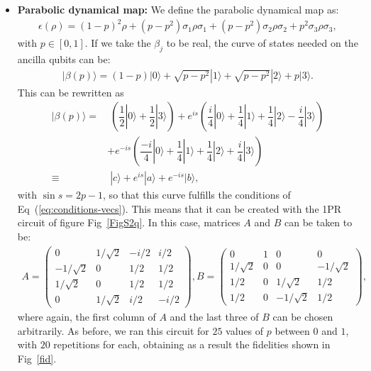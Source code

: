 \documentclass[10pt,letterpaper]{article} %
\newcommand{\fref}[1]{Fig~\ref{#1}}
\newcommand{\eref}[1]{Eq~(\ref{#1})}
\begin{document}
\begin{itemize}
\item \textbf{Parabolic dynamical map:} We define the parabolic dynamical map as:
\begin{eqnarray}
\epsilon(\rho) =  {(1-p)}^2  \rho + (p-p^2) \sigma_1 \rho \sigma_1 + (p-p^2) \sigma_2 \rho \sigma_2 + p^2 \sigma_3 \rho \sigma_3,
\label{eq:parab}
\end{eqnarray}
with $p \in [0,1]$. 
If we take the $\beta_j$ to be real,
the curve of states needed on the ancilla qubits can be:
\begin{eqnarray}
|\beta(p)\rangle =  (1-p) |0\rangle + \sqrt{p-p^2} |1\rangle +  \sqrt{p-p^2} |2\rangle + p |3\rangle.
\end{eqnarray}
This can be rewritten as
\begin{align*}
|\beta(p)\rangle =&\; \left( \dfrac{1}{2}|0\rangle + \dfrac{1}{2} |3\rangle \right) + e^{is} \left( \dfrac{i}{4}|0\rangle + \dfrac{1}{4} |1\rangle + \dfrac{1}{4} |2\rangle - \dfrac{i}{4} |3\rangle \right) \\
& + e^{-is}  \left( \dfrac{-i}{4} |0\rangle + \dfrac{1}{4} |1\rangle + \dfrac{1}{4} |2\rangle + \dfrac{i}{4} |3\rangle \right) \\
\equiv & \; |c\rangle + e^{is} |a\rangle + e^{-is} |b\rangle,
\end{align*}
with $\sin s = 2p-1$, so that
this curve fulfills the conditions of  \eref{eq:conditions-vecs}.
This  means that it can be created with the
1PR circuit of figure \fref{FigS2q}. In this
case, matrices $A$ and $B$ can be taken to be:
\begin{align*}
A = \begin{pmatrix}
0 & 1/\sqrt{2} & -i/2 & i/2 \\
-1/\sqrt{2} & 0 & 1/2 & 1/2 \\
1/\sqrt{2} & 0 & 1/2 & 1/2 \\
0 & 1/\sqrt{2} & i/2 & -i/2
\end{pmatrix},
B = \begin{pmatrix}
0 & 1 &0 &0 \\
1/\sqrt{2} & 0 & 0 &-1/\sqrt{2} \\
1/2 & 0 & 1/\sqrt{2} & 1/2 \\
1/2 & 0 & - 1/\sqrt{2} & 1/2
\end{pmatrix},
\end{align*}
where again, the first column of $A$ and the last three of $B$ can be chosen arbitrarily. 
As before, we ran this circuit for $25$ values of $p$ between $0$ and $1$, with $20$ repetitions for each,
obtaining as a result the fidelities shown in \fref{fid}.





\end{itemize}
\end{document}
